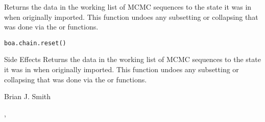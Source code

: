 \begin{Description}\relax
Returns the data in the working list of MCMC sequences to the state it was in
when originally imported. This function undoes any subsetting or collapsing
that was done via the  or 
 functions.
\end{Description}
\begin{Usage}
\begin{verbatim}
boa.chain.reset()
\end{verbatim}
\end{Usage}
\begin{Section}{Side Effects}
Returns the data in the working list of MCMC sequences to the state it was in
when originally imported. This function undoes any subsetting or collapsing
that was done via the  or 
 functions.
\end{Section}
\begin{Author}\relax
Brian J. Smith
\end{Author}
\begin{SeeAlso}\relax
{}, 
\end{SeeAlso}

